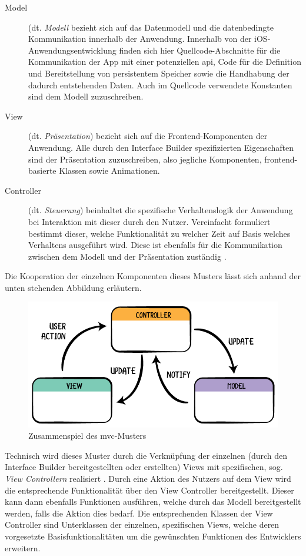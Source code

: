 \begin{description}
	\item[Model] (dt. \textit{Modell} bezieht sich auf das Datenmodell und die datenbedingte Kommunikation innerhalb der Anwendung. Innerhalb von der iOS-Anwendungsentwicklung finden sich hier Quellcode-Abschnitte für die Kommunikation der App mit einer potenziellen \acs{api}, Code für die Definition und Bereitstellung von persistentem Speicher sowie die Handhabung der dadurch entstehenden Daten. Auch im Quellcode verwendete Konstanten sind dem Modell zuzuschreiben.
	\item[View] (dt. \textit{Präsentation}) bezieht sich auf die Frontend-Komponenten der Anwendung. Alle durch den Interface Builder spezifizierten Eigenschaften sind der Präsentation zuzuschreiben, also jegliche Komponenten, frontend-basierte Klassen sowie Animationen.
	\item[Controller] (dt. \textit{Steuerung}) beinhaltet die spezifische Verhaltenslogik der Anwendung bei Interaktion mit dieser durch den Nutzer. Vereinfacht formuliert bestimmt dieser, welche Funktionalität zu welcher Zeit auf Basis welches Verhaltens ausgeführt wird. Diese ist ebenfalls für die Kommunikation zwischen dem Modell und der Präsentation zuständig \cite{LesevaAdams2016}.
\end{description}

Die Kooperation der einzelnen Komponenten dieses Musters lässt sich anhand der unten stehenden Abbildung erläutern.

\begin{figure}[h!]
	\centering
	\includegraphics[width=0.5\linewidth]{img/fig/2-3-2_MVC}
	\caption{Zusammenspiel des \ac{mvc}-Musters \cite{RayMVC}}
\end{figure}

Technisch wird dieses Muster durch die Verknüpfung der einzelnen (durch den Interface Builder bereitgestellten oder erstellten) Views mit spezifischen, sog. \textit{View Controllern} realisiert \cite{AppleMVC}. Durch eine Aktion des Nutzers auf dem View wird die entsprechende Funktionalität über den View Controller bereitgestellt. Dieser kann dann ebenfalls Funktionen ausführen, welche durch das Modell bereitgestellt werden, falls die Aktion dies bedarf. Die entsprechenden Klassen der View Controller sind Unterklassen der einzelnen, spezifischen Views, welche deren vorgesetzte Basisfunktionalitäten um die gewünschten Funktionen des Entwicklers erweitern.

